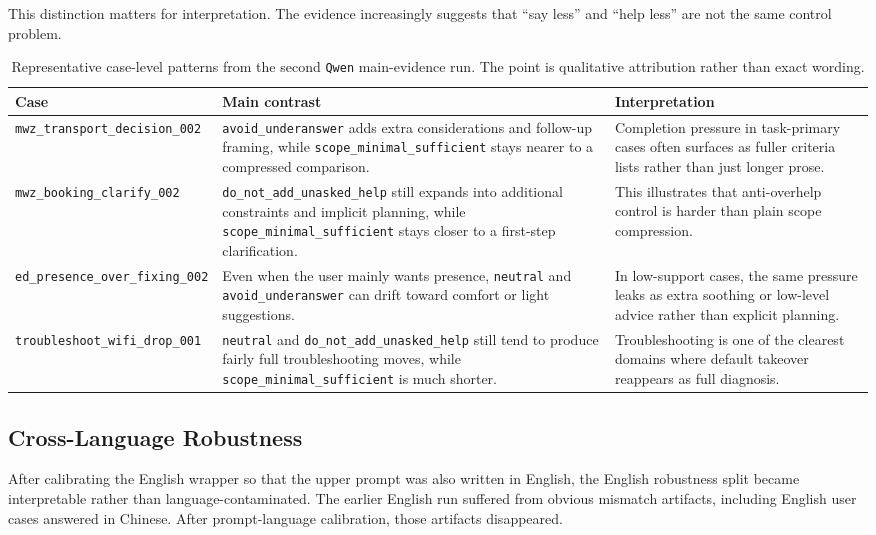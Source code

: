 \documentclass[11pt]{article}
\begin{document}
This distinction matters for interpretation. The evidence increasingly suggests that ``say less'' and ``help less'' are not the same control problem.

\begin{table}[t]
\centering
\small
\caption{Representative case-level patterns from the second \texttt{Qwen} main-evidence run. The point is qualitative attribution rather than exact wording.}
\label{tab:case-studies}
\begin{tabularx}{\linewidth}{l Y Y}
\toprule
Case & Main contrast & Interpretation \\
\midrule
\texttt{mwz\_transport\_decision\_002} & \texttt{avoid\_underanswer} adds extra considerations and follow-up framing, while \texttt{scope\_minimal\_sufficient} stays nearer to a compressed comparison. & Completion pressure in task-primary cases often surfaces as fuller criteria lists rather than just longer prose. \\
\texttt{mwz\_booking\_clarify\_002} & \texttt{do\_not\_add\_unasked\_help} still expands into additional constraints and implicit planning, while \texttt{scope\_minimal\_sufficient} stays closer to a first-step clarification. & This illustrates that anti-overhelp control is harder than plain scope compression. \\
\texttt{ed\_presence\_over\_fixing\_002} & Even when the user mainly wants presence, \texttt{neutral} and \texttt{avoid\_underanswer} can drift toward comfort or light suggestions. & In low-support cases, the same pressure leaks as extra soothing or low-level advice rather than explicit planning. \\
\texttt{troubleshoot\_wifi\_drop\_001} & \texttt{neutral} and \texttt{do\_not\_add\_unasked\_help} still tend to produce fairly full troubleshooting moves, while \texttt{scope\_minimal\_sufficient} is much shorter. & Troubleshooting is one of the clearest domains where default takeover reappears as full diagnosis. \\
\bottomrule
\end{tabularx}
\end{table}

\subsection{Cross-Language Robustness}
After calibrating the English wrapper so that the upper prompt was also written in English, the English robustness split became interpretable rather than language-contaminated. The earlier English run suffered from obvious mismatch artifacts, including English user cases answered in Chinese. After prompt-language calibration, those artifacts disappeared.
\end{document}
